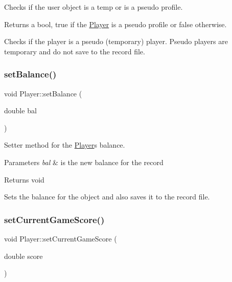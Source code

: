 Checks if the user object is a temp or is a pseudo profile. 

\begin{DoxyReturn}{Returns}
a bool, true if the \mbox{\hyperlink{class_player}{Player}} is a pseudo profile or false otherwise.
\end{DoxyReturn}
Checks if the player is a pseudo (temporary) player. Pseudo players are temporary and do not save to the record file. \mbox{\label{class_player_a7bdcb72d5d22f6f7c1dfa48d960b6d73}} 
\subsubsection{\texorpdfstring{set\+Balance()}{setBalance()}}
{\footnotesize\ttfamily void Player\+::set\+Balance (\begin{DoxyParamCaption}\item[{double}]{bal }\end{DoxyParamCaption})}



Setter method for the \mbox{\hyperlink{class_player}{Player}}\textquotesingle{}s balance. 


\begin{DoxyParams}{Parameters}
{\em bal} & is the new balance for the record \\
\hline
\end{DoxyParams}
\begin{DoxyReturn}{Returns}
void
\end{DoxyReturn}
Sets the balance for the object and also saves it to the record file. \mbox{\label{class_player_a1b2af56d4beb6e7a7961b3b572b42bdb}} 
\subsubsection{\texorpdfstring{set\+Current\+Game\+Score()}{setCurrentGameScore()}}
{\footnotesize\ttfamily void Player\+::set\+Current\+Game\+Score (\begin{DoxyParamCaption}\item[{double}]{score }\end{DoxyParamCaption})}



